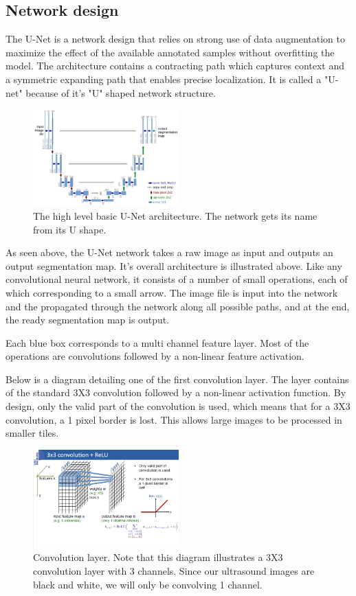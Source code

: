 \documentclass[letterpaper]{article}
\begin{document}
\subsection{Network design}
The U-Net is a network design that relies on strong use of data augmentation to maximize the effect of the available annotated samples without overfitting the model. The architecture contains a contracting path which captures context and a symmetric expanding path that enables precise localization. It is called a "U-net" because of it's "U" shaped network structure.


 \begin{figure}[H]
  \centerline{\includegraphics[width=0.5\textwidth]{Images/UNET.png}}
  \caption{The high level basic U-Net architecture. The network gets its name from its U shape.}
  \label{fig:unet}
\end{figure}

As seen above, the U-Net network takes a raw image as input and outputs an output segmentation map. 
It's overall architecture is illustrated above. Like any convolutional neural network, it consists of a number of small operations, each of which corresponding to a small arrow. The image file is input into the network and the propagated through the network along all possible paths,  and at the end, the ready segmentation map is output.

Each blue box corresponds to a multi channel feature layer. Most of the operations are convolutions followed by a non-linear feature activation. 

Below is a diagram detailing one of the first convolution layer. The layer contains of the standard 3X3 convolution followed by a non-linear activation function. By design, only the valid part of the convolution is used, which means that for a 3X3 convolution, a 1 pixel border is lost. This allows large images to be processed in smaller tiles. 	

 \begin{figure}[H]
  \centerline{\includegraphics[width=0.5\textwidth]{Images/UNET1.png}}
  \caption{Convolution layer. Note that this diagram illustrates a 3X3 convolution layer with 3 channels. Since our ultrasound images are black and white, we will only be convolving 1 channel.}
  \label{fig:unet1}
\end{figure}
\end{document}
